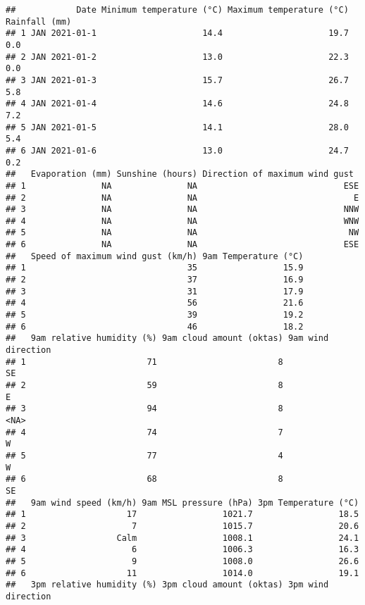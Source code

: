 \documentclass[
]{article}
\begin{document}
\begin{verbatim}
##            Date Minimum temperature (°C) Maximum temperature (°C) Rainfall (mm)
## 1 JAN 2021-01-1                     14.4                     19.7           0.0
## 2 JAN 2021-01-2                     13.0                     22.3           0.0
## 3 JAN 2021-01-3                     15.7                     26.7           5.8
## 4 JAN 2021-01-4                     14.6                     24.8           7.2
## 5 JAN 2021-01-5                     14.1                     28.0           5.4
## 6 JAN 2021-01-6                     13.0                     24.7           0.2
##   Evaporation (mm) Sunshine (hours) Direction of maximum wind gust 
## 1               NA               NA                             ESE
## 2               NA               NA                               E
## 3               NA               NA                             NNW
## 4               NA               NA                             WNW
## 5               NA               NA                              NW
## 6               NA               NA                             ESE
##   Speed of maximum wind gust (km/h) 9am Temperature (°C)
## 1                                35                 15.9
## 2                                37                 16.9
## 3                                31                 17.9
## 4                                56                 21.6
## 5                                39                 19.2
## 6                                46                 18.2
##   9am relative humidity (%) 9am cloud amount (oktas) 9am wind direction
## 1                        71                        8                 SE
## 2                        59                        8                  E
## 3                        94                        8               <NA>
## 4                        74                        7                  W
## 5                        77                        4                  W
## 6                        68                        8                 SE
##   9am wind speed (km/h) 9am MSL pressure (hPa) 3pm Temperature (°C)
## 1                    17                 1021.7                 18.5
## 2                     7                 1015.7                 20.6
## 3                  Calm                 1008.1                 24.1
## 4                     6                 1006.3                 16.3
## 5                     9                 1008.0                 26.6
## 6                    11                 1014.0                 19.1
##   3pm relative humidity (%) 3pm cloud amount (oktas) 3pm wind direction

\end{verbatim}
\end{document}
